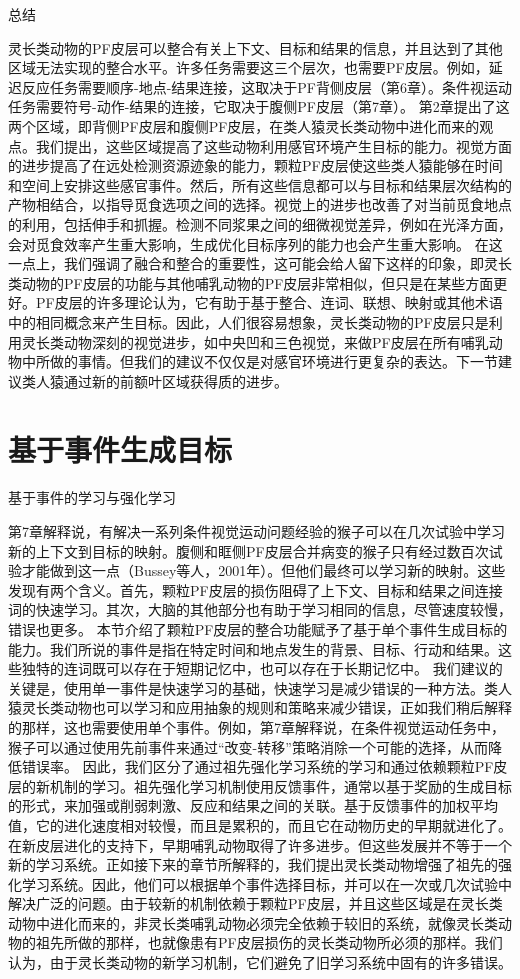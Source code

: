 总结

灵长类动物的PF皮层可以整合有关上下文、目标和结果的信息，并且达到了其他区域无法实现的整合水平。许多任务需要这三个层次，也需要PF皮层。例如，延迟反应任务需要顺序-地点-结果连接，这取决于PF背侧皮层（第6章）。条件视运动任务需要符号-动作-结果的连接，它取决于腹侧PF皮层（第7章）。
第2章提出了这两个区域，即背侧PF皮层和腹侧PF皮层，在类人猿灵长类动物中进化而来的观点。我们提出，这些区域提高了这些动物利用感官环境产生目标的能力。视觉方面的进步提高了在远处检测资源迹象的能力，颗粒PF皮层使这些类人猿能够在时间和空间上安排这些感官事件。然后，所有这些信息都可以与目标和结果层次结构的产物相结合，以指导觅食选项之间的选择。视觉上的进步也改善了对当前觅食地点的利用，包括伸手和抓握。检测不同浆果之间的细微视觉差异，例如在光泽方面，会对觅食效率产生重大影响，生成优化目标序列的能力也会产生重大影响。
在这一点上，我们强调了融合和整合的重要性，这可能会给人留下这样的印象，即灵长类动物的PF皮层的功能与其他哺乳动物的PF皮层非常相似，但只是在某些方面更好。PF皮层的许多理论认为，它有助于基于整合、连词、联想、映射或其他术语中的相同概念来产生目标。因此，人们很容易想象，灵长类动物的PF皮层只是利用灵长类动物深刻的视觉进步，如中央凹和三色视觉，来做PF皮层在所有哺乳动物中所做的事情。但我们的建议不仅仅是对感官环境进行更复杂的表达。下一节建议类人猿通过新的前额叶区域获得质的进步。


\section{基于事件生成目标}

基于事件的学习与强化学习

第7章解释说，有解决一系列条件视觉运动问题经验的猴子可以在几次试验中学习新的上下文到目标的映射。腹侧和眶侧PF皮层合并病变的猴子只有经过数百次试验才能做到这一点（Bussey等人，2001年）。但他们最终可以学习新的映射。这些发现有两个含义。首先，颗粒PF皮层的损伤阻碍了上下文、目标和结果之间连接词的快速学习。其次，大脑的其他部分也有助于学习相同的信息，尽管速度较慢，错误也更多。
本节介绍了颗粒PF皮层的整合功能赋予了基于单个事件生成目标的能力。我们所说的事件是指在特定时间和地点发生的背景、目标、行动和结果。这些独特的连词既可以存在于短期记忆中，也可以存在于长期记忆中。
我们建议的关键是，使用单一事件是快速学习的基础，快速学习是减少错误的一种方法。类人猿灵长类动物也可以学习和应用抽象的规则和策略来减少错误，正如我们稍后解释的那样，这也需要使用单个事件。例如，第7章解释说，在条件视觉运动任务中，猴子可以通过使用先前事件来通过“改变-转移”策略消除一个可能的选择，从而降低错误率。
因此，我们区分了通过祖先强化学习系统的学习和通过依赖颗粒PF皮层的新机制的学习。祖先强化学习机制使用反馈事件，通常以基于奖励的生成目标的形式，来加强或削弱刺激、反应和结果之间的关联。基于反馈事件的加权平均值，它的进化速度相对较慢，而且是累积的，而且它在动物历史的早期就进化了。
在新皮层进化的支持下，早期哺乳动物取得了许多进步。但这些发展并不等于一个新的学习系统。正如接下来的章节所解释的，我们提出灵长类动物增强了祖先的强化学习系统。因此，他们可以根据单个事件选择目标，并可以在一次或几次试验中解决广泛的问题。由于较新的机制依赖于颗粒PF皮层，并且这些区域是在灵长类动物中进化而来的，非灵长类哺乳动物必须完全依赖于较旧的系统，就像灵长类动物的祖先所做的那样，也就像患有PF皮层损伤的灵长类动物所必须的那样。我们认为，由于灵长类动物的新学习机制，它们避免了旧学习系统中固有的许多错误。

